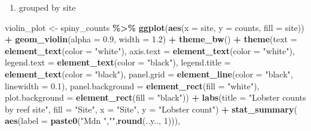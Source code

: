 \documentclass[
]{article}
\newenvironment{Shaded}{\begin{snugshade}}{\end{snugshade}}
\newcommand{\AttributeTok}[1]{\textcolor[rgb]{0.13,0.29,0.53}{#1}}
\newcommand{\DecValTok}[1]{\textcolor[rgb]{0.00,0.00,0.81}{#1}}
\newcommand{\FloatTok}[1]{\textcolor[rgb]{0.00,0.00,0.81}{#1}}
\newcommand{\FunctionTok}[1]{\textcolor[rgb]{0.13,0.29,0.53}{\textbf{#1}}}
\newcommand{\NormalTok}[1]{#1}
\newcommand{\OtherTok}[1]{\textcolor[rgb]{0.56,0.35,0.01}{#1}}
\newcommand{\SpecialCharTok}[1]{\textcolor[rgb]{0.81,0.36,0.00}{\textbf{#1}}}
\newcommand{\StringTok}[1]{\textcolor[rgb]{0.31,0.60,0.02}{#1}}
\providecommand{\tightlist}{%
  \setlength{\itemsep}{0pt}\setlength{\parskip}{0pt}}
\begin{document}
\begin{enumerate}
\def\labelenumi{\arabic{enumi})}
\setcounter{enumi}{2}
\tightlist
\item
  grouped by site
\end{enumerate}

\begin{Shaded}
\begin{Highlighting}[]
\NormalTok{violin\_plot }\OtherTok{\textless{}{-}}\NormalTok{ spiny\_counts }\SpecialCharTok{\%\textgreater{}\%}
  \FunctionTok{ggplot}\NormalTok{(}\FunctionTok{aes}\NormalTok{(}\AttributeTok{x =}\NormalTok{ site, }\AttributeTok{y =}\NormalTok{ counts, }
             \AttributeTok{fill =}\NormalTok{ site)) }\SpecialCharTok{+}
  \FunctionTok{geom\_violin}\NormalTok{(}\AttributeTok{alpha =} \FloatTok{0.9}\NormalTok{,}
              \AttributeTok{width =} \FloatTok{1.2}\NormalTok{) }\SpecialCharTok{+}  
  \FunctionTok{theme\_bw}\NormalTok{() }\SpecialCharTok{+}
  \FunctionTok{theme}\NormalTok{(}\AttributeTok{text =} \FunctionTok{element\_text}\NormalTok{(}\AttributeTok{color =} \StringTok{"white"}\NormalTok{),}
        \AttributeTok{axis.text =} \FunctionTok{element\_text}\NormalTok{(}\AttributeTok{color =} \StringTok{"white"}\NormalTok{),}
        \AttributeTok{legend.text =} \FunctionTok{element\_text}\NormalTok{(}\AttributeTok{color =} \StringTok{"black"}\NormalTok{),}
        \AttributeTok{legend.title =} \FunctionTok{element\_text}\NormalTok{(}\AttributeTok{color =} \StringTok{"black"}\NormalTok{),}
        \AttributeTok{panel.grid =} \FunctionTok{element\_line}\NormalTok{(}\AttributeTok{color =} \StringTok{"black"}\NormalTok{,}
                                  \AttributeTok{linewidth =} \FloatTok{0.1}\NormalTok{),}
        \AttributeTok{panel.background =} \FunctionTok{element\_rect}\NormalTok{(}\AttributeTok{fill =} \StringTok{"white"}\NormalTok{),}
        \AttributeTok{plot.background =} \FunctionTok{element\_rect}\NormalTok{(}\AttributeTok{fill =} \StringTok{"black"}\NormalTok{)) }\SpecialCharTok{+}
  \FunctionTok{labs}\NormalTok{(}\AttributeTok{title =} \StringTok{"Lobster counts by reef site"}\NormalTok{,}
       \AttributeTok{fill =} \StringTok{"Site"}\NormalTok{,}
       \AttributeTok{x =} \StringTok{"Site"}\NormalTok{, }
       \AttributeTok{y =} \StringTok{"Lobster count"}\NormalTok{) }\SpecialCharTok{+}
  \FunctionTok{stat\_summary}\NormalTok{(}
    \FunctionTok{aes}\NormalTok{(}\AttributeTok{label =} \FunctionTok{paste0}\NormalTok{(}\StringTok{"Mdn "}\NormalTok{,}\StringTok{""}\NormalTok{,}\FunctionTok{round}\NormalTok{(..y.., }\DecValTok{1}\NormalTok{))),}

\end{Highlighting}
\end{Shaded}
\end{document}
